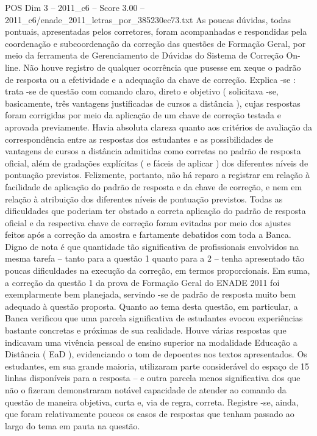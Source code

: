 \begin{textsample}{POS Dim 3 – 2011\_c6 – Score 3.00 – 2011\_c6/enade\_2011\_letras\_por\_385230ec73.txt}
As poucas dúvidas, todas pontuais, apresentadas pelos corretores, foram acompanhadas e respondidas pela coordenação e subcoordenação da correção das questões de Formação Geral, por meio da ferramenta de Gerenciamento de Dúvidas do Sistema de Correção On-line.
Não houve registro de qualquer ocorrência que pusesse em xeque o padrão de resposta ou a efetividade e a adequação da chave de correção.
Explica -se : trata -se de questão com comando claro, direto e objetivo ( solicitava -se, basicamente, três vantagens justificadas de cursos a distância ), cujas respostas foram corrigidas por meio da aplicação de um chave de correção testada e aprovada previamente.
Havia absoluta clareza quanto aos critérios de avaliação da correspondência entre as respostas dos estudantes e as possibilidades de vantagens de cursos a distância admitidas como corretas no padrão de resposta oficial, além de gradações explícitas ( e fáceis de aplicar ) dos diferentes níveis de pontuação previstos.
Felizmente, portanto, não há reparo a registrar em relação à facilidade de aplicação do padrão de resposta e da chave de correção, e nem em relação à atribuição dos diferentes níveis de pontuação previstos.
Todas as dificuldades que poderiam ter obstado a correta aplicação do padrão de resposta oficial e da respectiva chave de correção foram evitadas por meio dos ajustes feitos após a correção da amostra e fartamente debatidos com toda a Banca.
Digno de nota é que quantidade tão significativa de profissionais envolvidos na mesma tarefa – tanto para a questão 1 quanto para a 2 – tenha apresentado tão poucas dificuldades na execução da correção, em termos proporcionais.
Em suma, a correção da questão 1 da prova de Formação Geral do ENADE 2011 foi exemplarmente bem planejada, servindo -se de padrão de resposta muito bem adequado à questão proposta.
Quanto ao tema desta questão, em particular, a Banca verificou que uma parcela significativa de estudantes evocou experiências bastante concretas e próximas de sua realidade.
Houve várias respostas que indicavam uma vivência pessoal de ensino superior na modalidade Educação a Distância ( EaD ), evidenciando o tom de depoentes nos textos apresentados.
Os estudantes, em sua grande maioria, utilizaram parte considerável do espaço de 15 linhas disponíveis para a resposta – e outra parcela menos significativa dos que não o fizeram demonstraram notável capacidade de atender ao comando da questão de maneira objetiva, curta e, via de regra, correta.
Registre -se, ainda, que foram relativamente poucos os casos de respostas que tenham passado ao largo do tema em pauta na questão.

\end{textsample}
